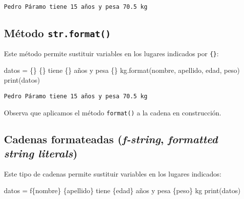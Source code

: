 \documentclass[
  spanish,
  letterpaper,
]{scrbook}
\newenvironment{Shaded}{\begin{snugshade}}{\end{snugshade}}
\newcommand{\BuiltInTok}[1]{\textcolor[rgb]{0.00,0.23,0.31}{#1}}
\newcommand{\NormalTok}[1]{\textcolor[rgb]{0.00,0.23,0.31}{#1}}
\newcommand{\OperatorTok}[1]{\textcolor[rgb]{0.37,0.37,0.37}{#1}}
\newcommand{\SpecialCharTok}[1]{\textcolor[rgb]{0.37,0.37,0.37}{#1}}
\newcommand{\SpecialStringTok}[1]{\textcolor[rgb]{0.13,0.47,0.30}{#1}}
\newcommand{\StringTok}[1]{\textcolor[rgb]{0.13,0.47,0.30}{#1}}
\theoremstyle{definition}
\theoremstyle{remark}
\begin{document}
\begin{verbatim}
Pedro Páramo tiene 15 años y pesa 70.5 kg
\end{verbatim}

\subsection{\texorpdfstring{Método
\texttt{str.format()}}{Método str.format()}}\label{muxe9todo-str.format-1}

Este método permite sustituir variables en los lugares indicados por
\texttt{\{\}}:

\begin{Shaded}
\begin{Highlighting}[]
\NormalTok{datos }\OperatorTok{=} \StringTok{\textquotesingle{}}\SpecialCharTok{\{\}}\StringTok{ }\SpecialCharTok{\{\}}\StringTok{ tiene }\SpecialCharTok{\{\}}\StringTok{ años y pesa }\SpecialCharTok{\{\}}\StringTok{ kg\textquotesingle{}}\NormalTok{.}\BuiltInTok{format}\NormalTok{(nombre, apellido, edad, peso)}
\BuiltInTok{print}\NormalTok{(datos)}
\end{Highlighting}
\end{Shaded}

\begin{verbatim}
Pedro Páramo tiene 15 años y pesa 70.5 kg
\end{verbatim}

Observa que aplicamos el método \texttt{format()} a la cadena en
construcción.

\subsection{\texorpdfstring{Cadenas formateadas (\emph{f-string},
\emph{formatted string
literals})}{Cadenas formateadas (f-string, formatted string literals)}}\label{cadenas-formateadas-f-string-formatted-string-literals-1}

Este tipo de cadenas permite sustituir variables en los lugares
indicados:

\begin{Shaded}
\begin{Highlighting}[]
\NormalTok{datos }\OperatorTok{=} \SpecialStringTok{f\textquotesingle{}}\SpecialCharTok{\{}\NormalTok{nombre}\SpecialCharTok{\}}\SpecialStringTok{ }\SpecialCharTok{\{}\NormalTok{apellido}\SpecialCharTok{\}}\SpecialStringTok{ tiene }\SpecialCharTok{\{}\NormalTok{edad}\SpecialCharTok{\}}\SpecialStringTok{ años y pesa }\SpecialCharTok{\{}\NormalTok{peso}\SpecialCharTok{\}}\SpecialStringTok{ kg\textquotesingle{}}
\BuiltInTok{print}\NormalTok{(datos)}
\end{Highlighting}
\end{Shaded}
\end{document}
